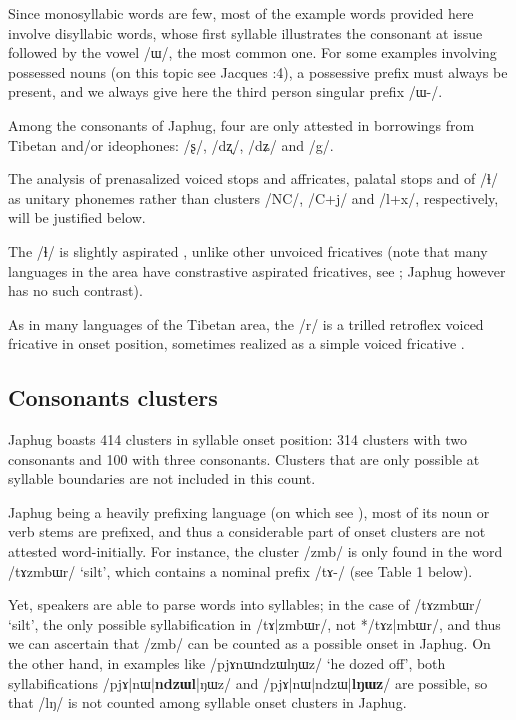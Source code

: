 \documentclass[12pt]{article}
\newcommand{\ipa}[1]{\mbox{\phon/#1/}}
\newcommand{\phonet}[1]{\mbox{\phon[#1]}}
\begin{document}
Since monosyllabic words are few,  most of the example words provided here involve disyllabic words, whose first syllable illustrates the consonant at issue followed by the vowel \ipa{ɯ}, the most common one. For some examples involving possessed nouns (on this topic see Jacques \citeyear{jacques14antipassive}:4), a possessive prefix must always be present, and we always give here the third person singular prefix  \ipa{ɯ-}.
 
Among the consonants of Japhug, four are only attested in borrowings from Tibetan and/or ideophones: \ipa{ʂ}, \ipa{dʐ}, \ipa{dʑ} and \ipa{g}.

The analysis of prenasalized voiced stops and affricates, palatal stops and of \ipa{ɬ} as unitary phonemes rather than clusters \ipa{NC}, \ipa{C+j} and \ipa{l+x}, respectively, will be justified  below. 

The \ipa{ɬ} is slightly aspirated \phonet{ɬʰ}, unlike other unvoiced fricatives (note that many languages in the area have constrastive aspirated fricatives, see \citealt{jacques11lingua}; Japhug however has no such contrast).


As in many languages of the Tibetan area, the \ipa{r} is a trilled retroflex voiced fricative \phonet{ɽ͡ʐ} in onset position, sometimes realized as a simple voiced fricative \phonet{ʐ}.


  \subsection*{Consonants clusters} \label{sec:clusters}
  Japhug boasts 414 clusters in syllable onset position:  314 clusters with two consonants and 100 with three consonants. Clusters that are only possible at syllable boundaries are not included in this count. 
  
  Japhug being a heavily prefixing language (on which see \citealt{jacques13harmonization}), most of its noun or verb stems are prefixed, and thus a considerable part of onset clusters are not attested word-initially. For instance, the cluster \ipa{zmb} is only found in the word \ipa{tɤzmbɯr}  `silt', which contains a nominal prefix \ipa{tɤ-} (see Table 1 below). 
  
  Yet, speakers are able to parse words into syllables; in the case of \ipa{tɤzmbɯr}  `silt', the only possible syllabification in \ipa{tɤ|zmbɯr}, not *\ipa{tɤz|mbɯr}, and thus we can ascertain that \ipa{zmb} can be counted as a possible onset in Japhug. On the other hand, in examples like \ipa{pjɤnɯndzɯlŋɯz} `he dozed off', both syllabifications \ipa{pjɤ|nɯ|\textbf{ndzɯl}|ŋɯz} and \ipa{pjɤ|nɯ|ndzɯ|\textbf{lŋɯz}} are possible, so that \ipa{lŋ} is not counted among syllable onset clusters in Japhug.
  
\end{document}
